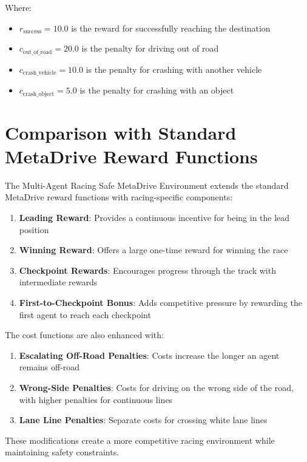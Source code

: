 \documentclass{article}
\begin{document}
Where:
\begin{itemize}
\item $r_{\text{success}} = 10.0$ is the reward for successfully reaching the destination
\item $c_{\text{out\_of\_road}} = 20.0$ is the penalty for driving out of road
\item $c_{\text{crash\_vehicle}} = 10.0$ is the penalty for crashing with another vehicle
\item $c_{\text{crash\_object}} = 5.0$ is the penalty for crashing with an object
\end{itemize}

\section{Comparison with Standard MetaDrive Reward Functions}

The Multi-Agent Racing Safe MetaDrive Environment extends the standard MetaDrive reward functions with racing-specific components:

\begin{enumerate}
\item \textbf{Leading Reward}: Provides a continuous incentive for being in the lead position
\item \textbf{Winning Reward}: Offers a large one-time reward for winning the race
\item \textbf{Checkpoint Rewards}: Encourages progress through the track with intermediate rewards
\item \textbf{First-to-Checkpoint Bonus}: Adds competitive pressure by rewarding the first agent to reach each checkpoint
\end{enumerate}

The cost functions are also enhanced with:

\begin{enumerate}
\item \textbf{Escalating Off-Road Penalties}: Costs increase the longer an agent remains off-road
\item \textbf{Wrong-Side Penalties}: Costs for driving on the wrong side of the road, with higher penalties for continuous lines
\item \textbf{Lane Line Penalties}: Separate costs for crossing white lane lines
\end{enumerate}

These modifications create a more competitive racing environment while maintaining safety constraints.
\end{document}
